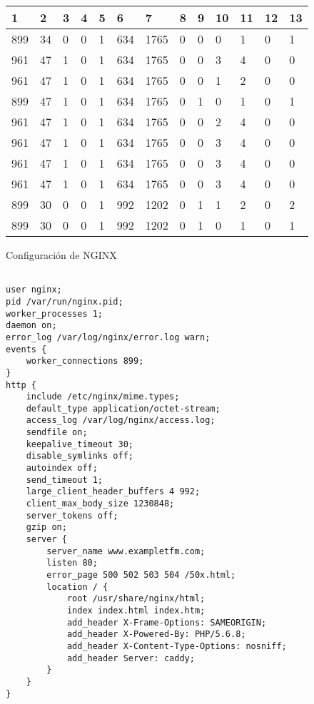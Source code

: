 \begin{table}[H]
\begin{tabular}{|l|l|l|l|l|l|l|l|l|l|l|l|l|}
\hline
\textbf{1} & \textbf{2} & \textbf{3} & \textbf{4} & \textbf{5} & \textbf{6} & \textbf{7} & \textbf{8} & \textbf{9} & \textbf{10} & \textbf{11} & \textbf{12} & \textbf{13} \\ \hline
899  &  34  &  0  &  0  &  1  &  634  &  1765  &  0  &  0  &  0  &  1  &  0  &  1 \\ \hline
961  &  47  &  1  &  0  &  1  &  634  &  1765  &  0  &  0  &  3  &  {\color[HTML]{FE0000}4}  &  0  &  0 \\ \hline
961  &  47  &  1  &  0  &  1  &  634  &  1765  &  0  &  0  &  1  &  2  &  0  &  0 \\ \hline
899  &  47  &  1  &  0  &  1  &  634  &  1765  &  0  &  1  &  0  &  1  &  0  &  1 \\ \hline
961  &  47  &  1  &  0  &  1  &  634  &  1765  &  0  &  0  &  2  &  {\color[HTML]{FE0000}4}  &  0  &  0 \\ \hline
961  &  47  &  1  &  0  &  1  &  634  &  1765  &  0  &  0  &  3  &  {\color[HTML]{FE0000}4}  &  0  &  0 \\ \hline
961  &  47  &  1  &  0  &  1  &  634  &  1765  &  0  &  0  &  3  &  {\color[HTML]{FE0000}4}  &  0  &  0 \\ \hline
961  &  47  &  1  &  0  &  1  &  634  &  1765  &  0  &  0  &  3  &  {\color[HTML]{FE0000}4}  &  0  &  0 \\ \hline
899  &  30  &  0  &  0  &  1  &  992  &  1202  &  0  &  1  &  1  &  2  &  0  &  2 \\ \hline
899  &  30  &  0  &  0  &  1  &  992  &  1202  &  0  &  1  &  0  &  1  &  0  &  1 \\ \hline
\end{tabular}
\end{table}
Configuración de NGINX
\begin{lstlisting}[label={lst:nginx_config_random},caption={Configuración de NGINX tras 2 generaciones}]

user nginx;
pid /var/run/nginx.pid;
worker_processes 1;
daemon on;
error_log /var/log/nginx/error.log warn;
events {
    worker_connections 899;
}
http {
    include /etc/nginx/mime.types;
    default_type application/octet-stream;
    access_log /var/log/nginx/access.log;
    sendfile on;
    keepalive_timeout 30;
    disable_symlinks off;
    autoindex off;
    send_timeout 1;
    large_client_header_buffers 4 992;
    client_max_body_size 1230848;
    server_tokens off;
    gzip on;
    server {
        server_name www.exampletfm.com;
        listen 80;
        error_page 500 502 503 504 /50x.html;
        location / {
            root /usr/share/nginx/html;
            index index.html index.htm;
            add_header X-Frame-Options: SAMEORIGIN;
            add_header X-Powered-By: PHP/5.6.8;
            add_header X-Content-Type-Options: nosniff;
            add_header Server: caddy;
        }
    }
}
\end{lstlisting}

